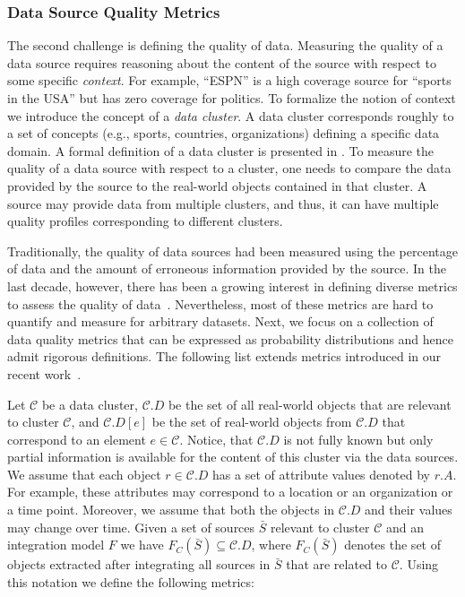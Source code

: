 \documentclass{sig-alternate}
\begin{document}
\subsubsection{Data Source Quality Metrics} 
\label{sec:quality}
The second challenge is defining the quality of data. Measuring the quality of a data source requires reasoning about the content of the source with respect to some specific {\em context}. For example, ``ESPN'' is a high coverage source for ``sports in the USA'' but has zero coverage for politics. To formalize the notion of context we introduce the concept of a {\em data cluster}. A data cluster corresponds roughly to a set of concepts (e.g.,  sports, countries, organizations) defining a specific data domain. A formal definition of a data cluster is presented in . To measure the quality of a data source with respect to a cluster, one needs to compare the data provided by the source to the real-world objects contained in that cluster. A source may provide data from multiple clusters, and thus, it can have multiple quality profiles corresponding to different clusters.

Traditionally, the quality of data sources had been measured using the percentage of data and the amount of erroneous information provided by the source. In the last decade, however, there has been a growing interest in defining diverse metrics to assess the quality of data~\cite{pipino:2002}. Nevertheless, most of these metrics are hard to quantify and measure for arbitrary datasets. Next, we focus on a collection of data quality metrics that can be expressed as probability distributions and hence admit rigorous definitions. The following list extends metrics introduced in our recent work~\cite{dong:vldb13, rekatsinas:2014}.

Let $\mathcal{C}$  be a data cluster,  $\mathcal{C}.D$ be the set of all real-world objects that are relevant to cluster $\mathcal{C}$, and $\mathcal{C}.D[e]$ be the set of real-world objects from $\mathcal{C}.D$ that correspond to an element $e \in \mathcal{C}$. Notice, that $\mathcal{C}.D$ is not fully known but only partial information is available for the content of this cluster via the data sources. We assume that each object $r \in \mathcal{C}.D$ has a set of attribute values denoted by $r.A$. For example, these attributes may correspond to a location or an organization or a time point. Moreover, we assume that both the objects in $\mathcal{C}.D$ and their values may change over time. Given a set of sources $\bar{S}$ relevant to cluster $\mathcal{C}$ and an integration model $F$ we have $F_C(\bar{S}) \subseteq \mathcal{C}.D$, where $F_C(\bar{S})$ denotes the set of objects extracted after integrating all sources in $\bar{S}$ that are related to $\mathcal{C}$. Using this notation we define the following metrics:
\end{document}
